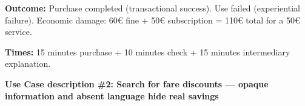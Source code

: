 ﻿\documentclass[11pt,a4paper]{article}
\begin{document}
\begin{tcolorbox}[base]
{    \textbf{Outcome:} Purchase completed (transactional success). Use failed (experiential failure). Economic damage: 60\euro{} fine + 50\euro{} subscription = 110\euro{} total for a 50\euro{} service.

    \textbf{Times:} 15 minutes purchase + 10 minutes check + 15 minutes intermediary explanation.
    }
\end{tcolorbox}

\vspace{0.3cm}


\begin{tcolorbox}[sectionbox,colback=primaryColor!10]
    \textbf{Use Case description \#2: Search for fare discounts --- opaque information and absent language hide real savings}
\end{tcolorbox}

\vspace{0.3cm}
\end{document}
